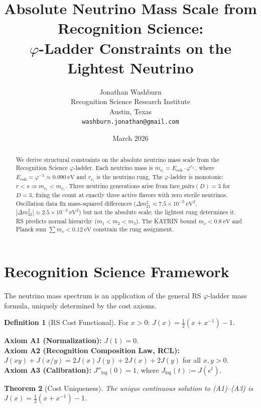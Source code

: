 \documentclass[12pt,a4paper]{article}
\title{Absolute Neutrino Mass Scale from Recognition Science:\\
$\varphi$-Ladder Constraints on the Lightest Neutrino}
\author{Jonathan Washburn\\
Recognition Science Research Institute\\
Austin, Texas\\
\texttt{washburn.jonathan@gmail.com}}
\date{March 2026}
\newtheorem{theorem}{Theorem}[section]
\theoremstyle{definition}
\newtheorem{definition}[theorem]{Definition}
\theoremstyle{remark}
\begin{document}
\maketitle

\begin{abstract}
We derive structural constraints on the absolute neutrino mass scale
from the Recognition Science $\varphi$-ladder.  Each neutrino mass is
$m_{\nu_i} = E_{\mathrm{coh}} \cdot \varphi^{r_{\nu_i}}$, where
$E_{\mathrm{coh}} = \varphi^{-5} \approx 0.090~\mathrm{eV}$ and
$r_{\nu_i}$ is the neutrino rung.  The $\varphi$-ladder is monotonic:
$r < s \Rightarrow m_{\nu_r} < m_{\nu_s}$.  Three neutrino generations
arise from $\mathrm{face\_pairs}(D) = 3$ for $D = 3$, fixing the count
at exactly three active flavors with zero sterile neutrinos.
Oscillation data fix mass-squared differences ($\Delta m^2_{21} \approx
7.5 \times 10^{-5}~\mathrm{eV}^2$, $|\Delta m^2_{32}| \approx 2.5
\times 10^{-3}~\mathrm{eV}^2$) but not the absolute scale; the
lightest rung determines it.  RS predicts normal hierarchy ($m_1 < m_2
< m_3$).  The KATRIN bound $m_\nu < 0.8~\mathrm{eV}$ and Planck sum
$\sum m_\nu < 0.12~\mathrm{eV}$ constrain the rung assignment.
\end{abstract}

\section{Recognition Science Framework}
\label{sec:framework}

The neutrino mass spectrum is an application of the general RS
$\varphi$-ladder mass formula, uniquely determined by the cost axioms.

\begin{definition}[RS Cost Functional]
For $x > 0$: $J(x) = \tfrac{1}{2}(x + x^{-1}) - 1$.
\end{definition}

\noindent\textbf{Axiom A1 (Normalization):} $J(1) = 0$.\\
\textbf{Axiom A2 (Recognition Composition Law, RCL):}
$J(xy)+J(x/y)=2J(x)J(y)+2J(x)+2J(y)$ for all $x,y>0$.\\
\textbf{Axiom A3 (Calibration):} $J''_{\log}(0) = 1$, where
$J_{\log}(t) := J(e^t)$.

\begin{theorem}[Cost Uniqueness]
\label{thm:unique}
The unique continuous solution to \textup{(A1)--(A3)} is
$J(x) = \tfrac{1}{2}(x + x^{-1}) - 1$.
\end{theorem}
\end{document}
